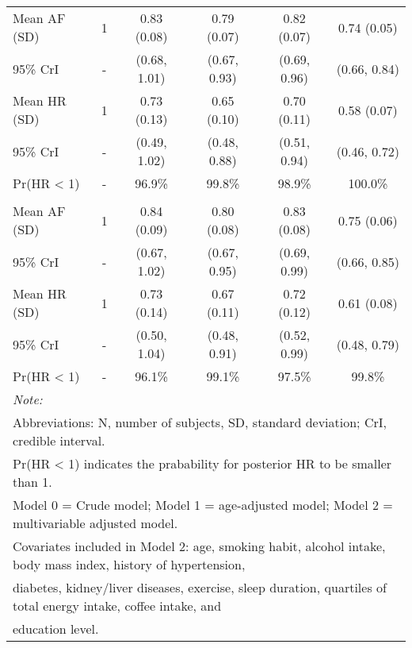 \documentclass[nutrients,article,submitted,moreauthors,pdftex]{Definitions/mdpi}
\begin{document}
\begin{table}[H]
{\begin{tabular}[t]{lccccc}
\rowcolor{gray!6}  \hspace{1em}Mean AF (SD) & 1 & 0.83 (0.08) & 0.79 (0.07) & 0.82 (0.07) & 0.74 (0.05)\\
\hspace{1em}95\% CrI & - & (0.68, 1.01) & (0.67, 0.93) & (0.69, 0.96) & (0.66, 0.84)\\
\rowcolor{gray!6}  \hspace{1em}Mean HR (SD) & 1 & 0.73 (0.13) & 0.65 (0.10) & 0.70 (0.11) & 0.58 (0.07)\\
\hspace{1em}95\% CrI & - & (0.49, 1.02) & (0.48, 0.88) & (0.51, 0.94) & (0.46, 0.72)\\
\rowcolor{gray!6}  \hspace{1em}Pr(HR < 1) & - & 96.9\% & 99.8\% & 98.9\% & 100.0\%\\
\addlinespace[0.3em]
\multicolumn{6}{l}{\textbf{Model 2}}\\
\hspace{1em}Mean AF (SD) & 1 & 0.84 (0.09) & 0.80 (0.08) & 0.83 (0.08) & 0.75 (0.06)\\
\rowcolor{gray!6}  \hspace{1em}95\% CrI & - & (0.67, 1.02) & (0.67, 0.95) & (0.69, 0.99) & (0.66, 0.85)\\
\hspace{1em}Mean HR (SD) & 1 & 0.73 (0.14) & 0.67 (0.11) & 0.72 (0.12) & 0.61 (0.08)\\
\rowcolor{gray!6}  \hspace{1em}95\% CrI & - & (0.50, 1.04) & (0.48, 0.91) & (0.52, 0.99) & (0.48, 0.79)\\
\hspace{1em}Pr(HR < 1) & - & 96.1\% & 99.1\% & 97.5\% & 99.8\%\\
\bottomrule
\multicolumn{6}{l}{\textit{Note: }}\\
\multicolumn{6}{l}{Abbreviations: N, number of subjects, SD, standard deviation; CrI, credible interval.}\\
\multicolumn{6}{l}{ Pr(HR < 1) indicates the prabability for posterior HR to be smaller than 1.}\\
\multicolumn{6}{l}{Model 0 = Crude model; Model 1 = age-adjusted model; Model 2 = multivariable adjusted model.}\\
\multicolumn{6}{l}{Covariates included in Model 2: age, smoking habit, alcohol intake, body mass index, history of hypertension, }\\
\multicolumn{6}{l}{diabetes, kidney/liver diseases, exercise, sleep duration,  quartiles of total energy intake, coffee intake, and }\\
\multicolumn{6}{l}{education level.}\\
\end{tabular}}
\end{table}
\end{document}
